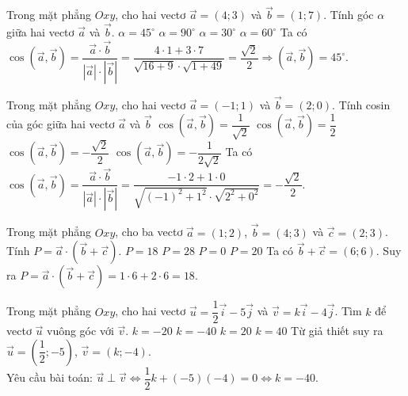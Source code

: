 \begin{ex}%
	Trong mặt phẳng $Oxy$, cho hai vectơ $\overrightarrow{a}=(4;3 )$ và $\overrightarrow{b}=(1;7 )$. Tính góc $\alpha $ giữa hai vectơ $\overrightarrow{a}$ và $\overrightarrow{b}$.
	\choice
	{\True $\alpha =45^\circ$}
	{$\alpha =90^\circ$}
	{$\alpha =30^\circ$}
	{$\alpha =60^\circ$}
	\loigiai
	{Ta có $\cos (\overrightarrow{a},\overrightarrow{b} )=\dfrac{\overrightarrow{a}\cdot\overrightarrow{b}}{\left| \overrightarrow{a} \right|\cdot \left| \overrightarrow{b} \right|}=\dfrac{4\cdot 1+3\cdot 7}{\sqrt{16+9}\cdot \sqrt{1+49}}=\dfrac{\sqrt{2}}{2}\Rightarrow(\overrightarrow{a},\overrightarrow{b} )=45^\circ$. }
\end{ex}

\begin{ex}%
	Trong mặt phẳng $Oxy$, cho hai vectơ $\overrightarrow{a}=(-1;1 )$ và $\overrightarrow{b}=(2;0 )$. Tính cosin của góc giữa hai vectơ $\overrightarrow{a}$ và $\overrightarrow{b}$
	\choice
	{$\cos (\overrightarrow{a},\overrightarrow{b} )=\dfrac{1}{\sqrt{2}}$}
	{$\cos (\overrightarrow{a},\overrightarrow{b} )=\dfrac{1}{2}$}
	{\True $\cos (\overrightarrow{a},\overrightarrow{b} )=-\dfrac{\sqrt{2}}{2}$}
	{ $\cos (\overrightarrow{a},\overrightarrow{b} )=-\dfrac{1}{2\sqrt{2}}$}
	\loigiai
	{Ta có $\cos (\overrightarrow{a},\overrightarrow{b} )=\dfrac{\overrightarrow{a}\cdot\overrightarrow{b}}{\left| \overrightarrow{a} \right|\cdot \left| \overrightarrow{b} \right|}=\dfrac{-1\cdot 2+1\cdot 0}{\sqrt{(-1 )^2+1^2}\cdot \sqrt{2^2+0^2}}=-\dfrac{\sqrt{2}}{2}$.}
\end{ex}

\begin{ex}%
	Trong mặt phẳng $Oxy$, cho ba vectơ $\overrightarrow{a}=(1;2 )$, $\overrightarrow{b}=(4;3 )$ và $\overrightarrow{c}=(2;3 )$.
	Tính $P=\overrightarrow{a}\cdot (\overrightarrow{b}+\overrightarrow{c} )$.
	\choice
	{\True $P=18$}
	{$P=28$}
	{$P=0$}
	{$P=20$}
	\loigiai
	{Ta có $\overrightarrow{b}+\overrightarrow{c}=(6;6 )$. Suy ra $P=\overrightarrow{a}\cdot (\overrightarrow{b}+\overrightarrow{c} )=1\cdot 6+2\cdot 6=18$.}
\end{ex}

\begin{ex}%
	Trong mặt phẳng $Oxy$, cho hai vectơ $\overrightarrow{u}=\dfrac{1}{2}\overrightarrow{i}-5\overrightarrow{j}$ và \break $\overrightarrow{v}=k\overrightarrow{i}-4\overrightarrow{j}$. Tìm $k$ để vectơ $\overrightarrow{u}$ vuông góc với $\overrightarrow{v}$.
	\choice
	{$k=-20$}
	{\True $k=-40$}
	{$k=20$}
	{$k=40$}
	\loigiai
	{Từ giả thiết suy ra $\overrightarrow{u}=(\dfrac{1}{2};-5 )$, $\overrightarrow{v}=(k;-4 )$.\\
		Yêu cầu bài toán: $\overrightarrow{u}\perp \overrightarrow{v}\Leftrightarrow \dfrac{1}{2}k+(-5 )(-4 )=0\Leftrightarrow k=-40$.}
\end{ex}

